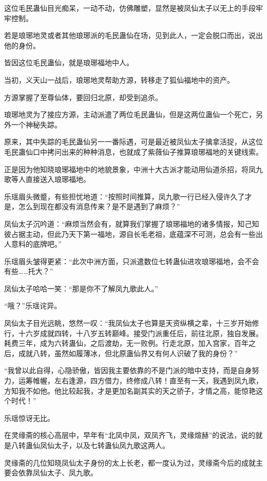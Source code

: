 \begin{this_body}
这位毛民蛊仙目光痴呆，一动不动，仿佛雕塑，显然是被凤仙太子以无上的手段牢牢控制。

若是琅琊地灵或者其他琅琊派的毛民蛊仙在场，见到此人，一定会脱口而出，说出他的身份。

皆因这位毛民蛊仙，就是琅琊福地中人。

当初，义天山一战后，琅琊地灵帮助方源，转移走了狐仙福地中的资产。

方源掌握了至尊仙体，要回归北原，却受到追杀。

琅琊地灵为了接应方源，主动派遣了两位毛民蛊仙，但是这两位蛊仙一个死亡，另外一个神秘失踪。

原来，其中失踪的毛民蛊仙另一一番际遇，可是最近被凤仙太子擒拿活捉，从这位毛民蛊仙口中拷问出来的种种消息，也就成了紫薇仙子推算琅琊福地的关键线索。

正是因为他知晓琅琊福地中的地貌景象，中洲十大古派才能动用仙道杀招，将凤九歌等人直接送入琅琊福地。

乐瑶眉头微蹙，有些担忧地道：“按照时间推算，凤九歌一行已经入侵许久了才是，怎么到现在都没有消息传来？是不是遇到了麻烦？”

凤仙太子沉吟道：“麻烦当然会有，就算我们掌握了琅琊福地的诸多情报，知己知彼占据主动，但此乃天下第一福地，源自长毛老祖，底蕴深不可测，总会有一些出人意料的底牌吧。”

乐瑶眉头皱得更紧：“此次中洲方面，只派遣数位七转蛊仙进攻琅琊福地，会不会有些……托大？”

凤仙太子哈哈一笑：“那是你不了解凤九歌此人。”

“哦？”乐瑶诧异。

凤仙太子目光远眺，悠然一叹：“我凤仙太子也算是天资纵横之辈，十三岁开始修行，十六岁成就四转，十八岁五转巅峰。接受门派重任后，前往北原，独自发展。耗费三年，成为六转蛊仙，之后渡劫，无一败例。行走北原，加入宫家，百年之后，成就八转，虽然如履薄冰，但北原蛊仙界又有何人识破了我的身份？”

“我曾以此自得，心隐骄傲，皆因我主要依靠的不是门派的暗中支持，而是自身努力，运筹帷幄，左右逢源，四方借力，终修成八转！直至有一天，我遇到凤九歌，方知我不如他。他比较起我，才是更加名副其实的天之骄子，才情之高，能惊艳这个时代！”

乐瑶惊讶无比。

在灵缘斋的核心高层中，早年有“北凤中凤，双凤齐飞，灵缘煊赫”的说法，说的就是八转蛊仙凤仙太子，以及七转蛊仙凤九歌这两人。

灵缘斋的几位知晓凤仙太子身份的太上长老，都一度认为过，灵缘斋今后的成就主要会依靠凤仙太子、凤九歌。


\end{this_body}
